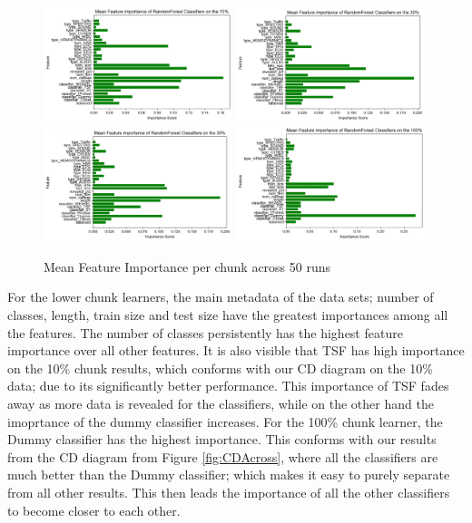\begin{figure}
    \captionsetup{justification=raggedright}
    \includegraphics[width=0.49\textwidth,keepaspectratio]{mean_feature_imp_10pct.png}
    \includegraphics[width=0.49\textwidth,keepaspectratio]{mean_feature_imp_20pct.png}
    \\[\smallskipamount]
    \includegraphics[width=0.49\textwidth,keepaspectratio]{mean_feature_imp_30pct.png}
    \includegraphics[width=0.49\textwidth,keepaspectratio]{mean_feature_imp_100pct.png}
    \caption{Mean Feature Importance per chunk across 50 runs}
    \label{Img:MeanFeatureImportance}
\end{figure}

For the lower chunk learners, the main metadata of the data sets; number of classes, length, train size and test size have the greatest importances among all the features.
The number of classes persistently has the highest feature importance over all other features.
It is also visible that TSF has high importance on the 10\% chunk results, which conforms with our CD diagram on the 10\% data; due to its significantly better performance.
This importance of TSF fades away as more data is revealed for the classifiers, while on the other hand the imoprtance of the dummy classifier increases.
For the 100\% chunk learner, the Dummy classifier has the highest importance.
This conforms with our results from the CD diagram from Figure \ref{fig:CDAcross},
where all the classifiers are much better than the Dummy classifier; which makes it easy to purely separate from all other results.
This then leads the importance of all the other classifiers to become closer to each other.

